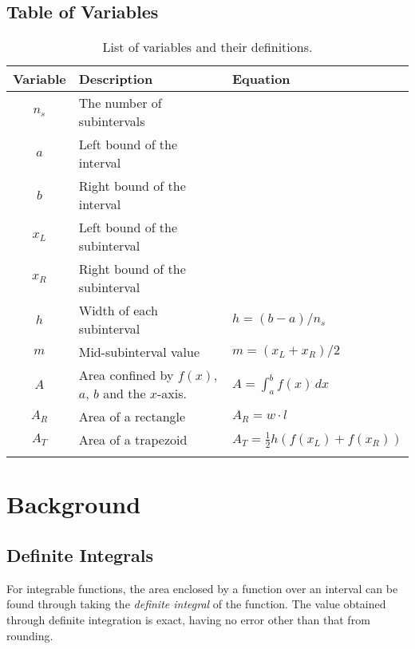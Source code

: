 \documentclass{paper}
\begin{document}
\subsection{Table of Variables}
\renewcommand{\arraystretch}{1.1}
\begin{table}[ht]
    \centering
    \begin{tabular}{cll}
            \dtoprule
            \textbf{Variable}   &   \textbf{Description}            &   \textbf{Equation}       \\
            \hline
            \(n_s\)             &   The number of subintervals      &                           \\
            \(a\)               &   Left bound of the interval      &                           \\
            \(b\)               &   Right bound of the interval     &                           \\
            \(x_L\)             &   Left bound of the subinterval   &                           \\
            \(x_R\)             &   Right bound of the subinterval  &                           \\
            \(h\)               &   Width of each subinterval       &   \(h=(b-a)/n_s\)         \\
            \(m\)               &   Mid-subinterval value           &   \(m=(x_L+x_R)/2\)       \\
            \(A\)               &   Area confined by \(f(x)\), \(a\), \(b\) and the \(x\)-axis. & \(A=\int_a^b f(x) \, dx\) \\
            \(A_R\)             &   Area of a rectangle             &   \(A_R=w \cdot l\)       \\
            \(A_T\)             &   Area of a trapezoid             &   \(A_T=\frac{1}{2} h (f(x_L) + f(x_R))\)  \\
            \dbottomrule
    \end{tabular}
    \caption{List of variables and their definitions.}
    \label{table:variables}
\end{table}

\section{Background}
\label{sec:background}
\subsection{Definite Integrals}
\label{sec:definite}
For integrable functions, the area enclosed by a function over an interval can be found through taking the \emph{definite integral} of the function.
The value obtained through definite integration is exact, having no error other than that from rounding.
\end{document}
